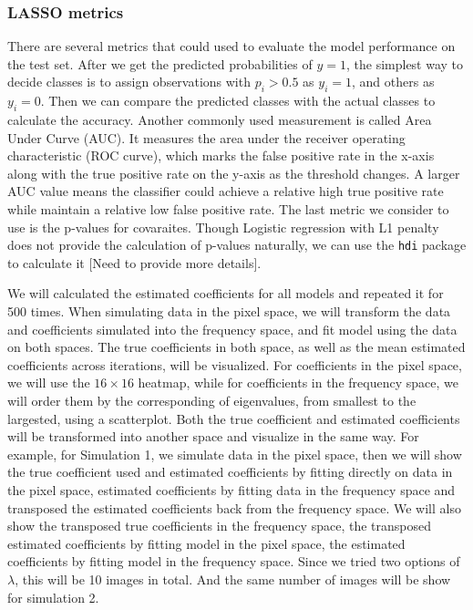 \documentclass[12pt]{article}
\begin{document}
\subsubsection{LASSO metrics}

There are several metrics that could used to evaluate the model performance on the test set. After we get the predicted probabilities of \( y=1 \), the simplest way to decide classes is to assign observations with \( p_i > 0.5 \) as \( y_i = 1 \), and others as \( y_i = 0 \). Then we can compare the predicted classes with the actual classes to calculate the accuracy. Another commonly used measurement is called Area Under Curve (AUC). It measures the area under the receiver operating characteristic (ROC curve), which marks the false positive rate in the x-axis along with the true positive rate on the y-axis as the threshold changes. A larger AUC value means the classifier could achieve a relative high true positive rate while maintain a relative low false positive rate. The last metric we consider to use is the p-values for covaraites. Though Logistic regression with L1 penalty does not provide the calculation of p-values naturally, we can use the \texttt{hdi} package to calculate it [Need to provide more details].

We will calculated the estimated coefficients for all models and repeated it for 500 times. When simulating data in the pixel space, we will transform the data and coefficients simulated into the frequency space, and fit model using the data on both spaces. The true coefficients in both space, as well as the mean estimated coefficients across iterations, will be visualized. For coefficients in the pixel space, we will use the \( 16 \times 16 \) heatmap, while for coefficients in the frequency space, we will order them by the corresponding of eigenvalues, from smallest to the largested, using a scatterplot. Both the true coefficient and estimated coefficients will be transformed into another space and visualize in the same way. For example, for Simulation 1, we simulate data in the pixel space, then we will show the true coefficient used and estimated coefficients by fitting directly on data in the pixel space, estimated coefficients by fitting data in the frequency space and transposed the estimated coefficients back from the frequency space. We will also show the transposed true coefficients in the frequency space, the transposed estimated coefficients by fitting model in the pixel space, the estimated coefficients by fitting model in the frequency space. Since we tried two options of \( \lambda \), this will be 10 images in total. And the same number of images will be show for simulation 2.
\end{document}
